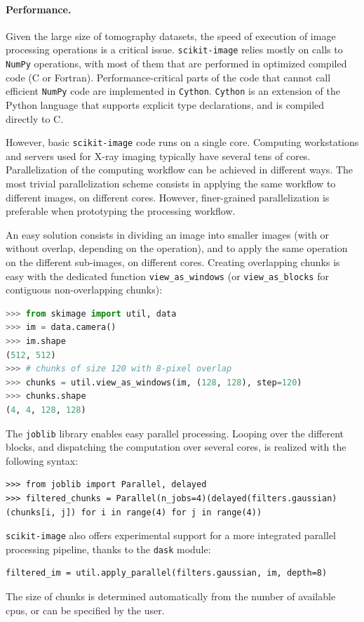 \documentclass[twocolumn]{bmcart}%
\begin{document}
\paragraph{Performance.}

Given the large size of tomography datasets, the speed of execution of image
processing operations is a critical issue. \texttt{scikit-image} relies mostly
on calls to \texttt{NumPy} operations, with most of them that are performed in
optimized compiled code (C or Fortran). Performance-critical parts of the code
that cannot call efficient \texttt{NumPy} code are implemented in
\texttt{Cython}. \texttt{Cython} \citep{Behnel2011} is an extension of the
Python language that supports explicit type declarations, and is compiled
directly to C. 

However, basic \texttt{scikit-image} code runs on a single core. Computing
workstations and servers used for X-ray imaging typically have several tens of
cores. Parallelization of the computing workflow can be achieved in different
ways. The most trivial parallelization scheme consists in applying the same
workflow to different images, on different cores. However, finer-grained
parallelization is preferable when prototyping the processing workflow.


An easy solution consists in dividing an image into smaller images (with
or without overlap, depending on the operation), and to apply the
same operation on the different sub-images, on different cores. Creating overlapping chunks is easy with the dedicated function \texttt{view\_as\_windows} (or \texttt{view\_as\_blocks} for contiguous non-overlapping chunks):
\begin{lstlisting}[language=Python]
>>> from skimage import util, data
>>> im = data.camera()
>>> im.shape
(512, 512)
>>> # chunks of size 120 with 8-pixel overlap
>>> chunks = util.view_as_windows(im, (128, 128), step=120)
>>> chunks.shape
(4, 4, 128, 128)
\end{lstlisting}
The \texttt{joblib} library enables easy parallel processing. Looping over the different blocks, and dispatching the computation over several cores, is realized with the following syntax:
\begin{lstlisting}
>>> from joblib import Parallel, delayed
>>> filtered_chunks = Parallel(n_jobs=4)(delayed(filters.gaussian)(chunks[i, j]) for i in range(4) for j in range(4))
\end{lstlisting}
\texttt{scikit-image} also offers experimental support for a more integrated parallel processing pipeline, thanks to the \texttt{dask} \citep{dask} module:
\begin{lstlisting}
filtered_im = util.apply_parallel(filters.gaussian, im, depth=8)
\end{lstlisting}
The size of chunks is determined automatically from the number of available cpus, or can be specified by the user.
\end{document}
